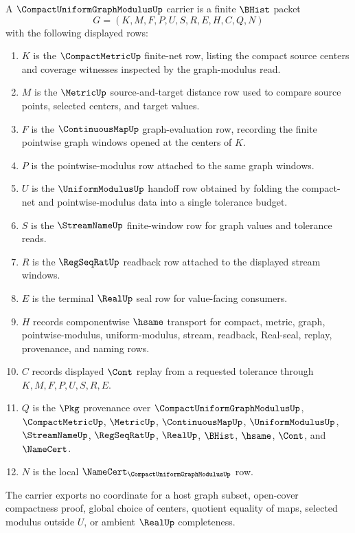 \begin{definition}
\label{def:compact-uniform-graph-modulus-carrier}
A $\CompactUniformGraphModulusUp$ carrier is a finite $\BHist$ packet
$$
G=(K,M,F,P,U,S,R,E,H,C,Q,N)
$$
with the following displayed rows:
\begin{enumerate}
\item $K$ is the $\CompactMetricUp$ finite-net row, listing the compact source centers and coverage witnesses inspected by the graph-modulus read.
\item $M$ is the $\MetricUp$ source-and-target distance row used to compare source points, selected centers, and target values.
\item $F$ is the $\ContinuousMapUp$ graph-evaluation row, recording the finite pointwise graph windows opened at the centers of $K$.
\item $P$ is the pointwise-modulus row attached to the same graph windows.
\item $U$ is the $\UniformModulusUp$ handoff row obtained by folding the compact-net and pointwise-modulus data into a single tolerance budget.
\item $S$ is the $\StreamNameUp$ finite-window row for graph values and tolerance reads.
\item $R$ is the $\RegSeqRatUp$ readback row attached to the displayed stream windows.
\item $E$ is the terminal $\RealUp$ seal row for value-facing consumers.
\item $H$ records componentwise $\hsame$ transport for compact, metric, graph, pointwise-modulus, uniform-modulus, stream, readback, Real-seal, replay, provenance, and naming rows.
\item $C$ records displayed $\Cont$ replay from a requested tolerance through $K,M,F,P,U,S,R,E$.
\item $Q$ is the $\Pkg$ provenance over $\CompactUniformGraphModulusUp$, $\CompactMetricUp$, $\MetricUp$, $\ContinuousMapUp$, $\UniformModulusUp$, $\StreamNameUp$, $\RegSeqRatUp$, $\RealUp$, $\BHist$, $\hsame$, $\Cont$, and $\NameCert$.
\item $N$ is the local $\NameCert_{\CompactUniformGraphModulusUp}$ row.
\end{enumerate}
The carrier exports no coordinate for a host graph subset, open-cover compactness proof, global choice of centers, quotient equality of maps, selected modulus outside $U$, or ambient $\RealUp$ completeness.
\end{definition}

